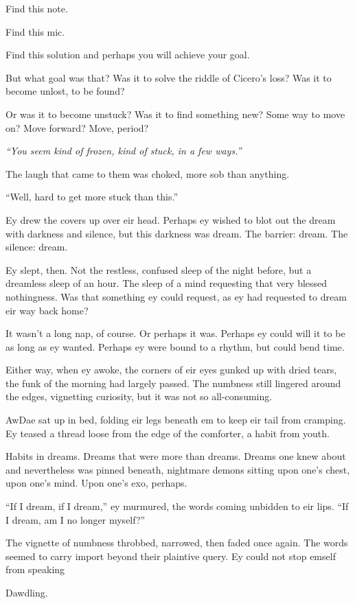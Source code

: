 Find this note.

Find this mic.

Find this solution and perhaps you will achieve your goal.

But what goal was that? Was it to solve the riddle of Cicero's loss? Was it to become unlost, to be found?

Or was it to become unstuck? Was it to find something new? Some way to move on? Move forward? Move, period?

\emph{``You seem kind of frozen, kind of stuck, in a few ways.''}

The laugh that came to them was choked, more sob than anything.

``Well, hard to get more stuck than this.''

Ey drew the covers up over eir head. Perhaps ey wished to blot out the dream with darkness and silence, but this darkness was dream. The barrier: dream. The silence: dream.

Ey slept, then. Not the restless, confused sleep of the night before, but a dreamless sleep of an hour. The sleep of a mind requesting that very blessed nothingness. Was that something ey could request, as ey had requested to dream eir way back home?

It wasn't a long nap, of course. Or perhaps it was. Perhaps ey could will it to be as long as ey wanted. Perhaps ey were bound to a rhythm, but could bend time.

Either way, when ey awoke, the corners of eir eyes gunked up with dried tears, the funk of the morning had largely passed. The numbness still lingered around the edges, vignetting curiosity, but it was not so all-consuming.

AwDae sat up in bed, folding eir legs beneath em to keep eir tail from cramping. Ey teased a thread loose from the edge of the comforter, a habit from youth.

Habits in dreams. Dreams that were more than dreams. Dreams one knew about and nevertheless was pinned beneath, nightmare demons sitting upon one's chest, upon one's mind. Upon one's exo, perhaps.

``If I dream, if I dream,'' ey murmured, the words coming unbidden to eir lips. ``If I dream, am I no longer myself?''

The vignette of numbness throbbed, narrowed, then faded once again. The words seemed to carry import beyond their plaintive query. Ey could not stop emself from speaking

Dawdling.

